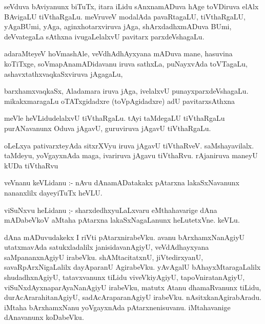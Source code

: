\documentclass{article}
\begin{document}
\begin{mn}
seVduva bAviyanunx biTuTx, itara iLidu sAnxnamADuva hAge toVDiruva  elAlx BAvigaLU  
tiVthaRgaLu.  meVruveV  modalAda pavaRtagaLU,  tiVthaRgaLU, yAgaBUmi, yAga,  aginxhotarxviruva 
jAga, shArxdadhxmADuva BUmi, deVvategaLa sAthxna ivugaLelalxvU pavitarx parxdeVshagaLu.
\end{mn}

\begin{mn}
adaraMteyeV  hoVmashAle,  veVdhAdhAyxyana  mADuva mane, hasuvina koTiTxge, soVmapAnamADidavanu  
iruva sathxLa, puNayxvAda toVTagaLu,  ashavxtathxvaqkaSxviruva jAgagaLu,
\end{mn}

\begin{mn}
barxhamxvaqkaSx, Aladamara iruva jAga, ivelalxvU punayxparxdeVshagaLu. mikakxmaragaLu  
oTATxgidadxre (toVpAgidadxre) adU pavitarxsAthxna
\end{mn}

\begin{mn}
meVle heVLidudelalxvU tiVthaRgaLu.  tAyi taMdegaLU  tiVthaRgaLu  purANavanunx 
Oduva jAgavU, guruviruva jAgavU tiVthaRgaLu. 
\end{mn}

\begin{mn}
oLeLxya pativarxteyAda sitxrXVyu iruva jAgavU tiVthaRveV.  saMshayavilalx.  
taMdeyu, yoVgayxnAda maga, ivariruva jAgavu tiVthaRvu. rAjaniruva maneyU kUDa tiVthaRvu
\end{mn}

\begin{mn}
veVnanu keVLidanu :- nAvu dAnamADatakakx pAtarxna lakaSxNavanunx nananxlilx dayeyiTuTx heVLU.
\end{mn}

\begin{mn}
viSuNxvu heLidanu ;- sharxdedhxyuLaLxvaru eMthahavarige dAna mADabeVkoV aMtaha 
pAtarxna lakaSxNagaLanunx heLutetxVne.  keVLu.
\end{mn}

\begin{mn}
dAna mADuvudakekx I riVti pAtarxnirabeVku.  avanu bArxhamxNanAgiyU  utatxmavAda satukxladalilx 
janisidavanAgiyU, veVdAdhayxyana saMpananxnAgiyU irabeVku. shAMtacitatxnU,  jiVtedirxyanU,
 savaRpArxNigaLalilx dayAparanU AgirabeVku.  yAvAgalU bAhayxMtaragaLalilx shudadhxnAgiyU, 
 tatavxvanunx  tiLidu viveVkiyAgiyU,  tapoVniratanAgiyU, viSuNxdAyxnaparAyaNanAgiyU irabeVku,  
 matutx Atanu dhamaRvanunx tiLidu, durAcArarahitanAgiyU, sadAcAraparanAgiyU  irabeVku. 
 nAsitxkanAgirabAradu.  iMtaha bArxhamxNanu yoVgayxnAda pAtarxnenisuvanu.  iMtahavanige dAnavanunx koDabeVku.
\end{mn}
\end{document}
